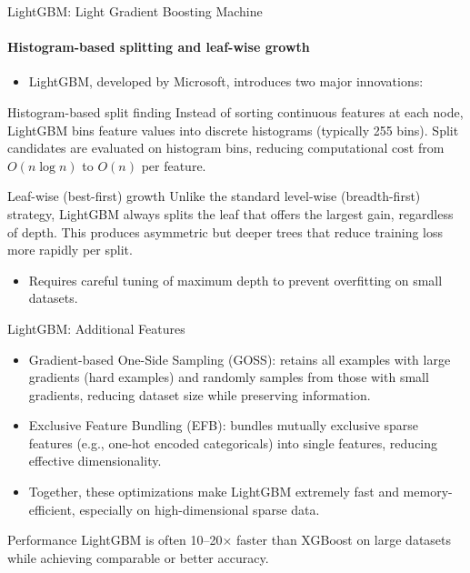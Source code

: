 \begin{frame}{LightGBM: Light Gradient Boosting Machine}
  \framesubtitle{Histogram-based splitting and leaf-wise growth}
  \begin{itemize}
    \item \alert{LightGBM}, developed by Microsoft, introduces two major innovations:
  \end{itemize}
  \begin{block}{Histogram-based split finding}
    Instead of sorting continuous features at each node, LightGBM bins feature values into
    discrete histograms (typically 255 bins). Split candidates are evaluated on histogram bins,
    reducing computational cost from $O(n\log n)$ to $O(n)$ per feature.
  \end{block}
  \begin{block}{Leaf-wise (best-first) growth}
    Unlike the standard level-wise (breadth-first) strategy, LightGBM always splits the leaf
    that offers the \alert{largest gain}, regardless of depth. This produces asymmetric but
    deeper trees that reduce training loss more rapidly per split.
  \end{block}
  \begin{itemize}
    \item Requires careful tuning of maximum depth to prevent overfitting on small datasets.
  \end{itemize}
\end{frame}

\begin{frame}{LightGBM: Additional Features}
  \begin{itemize}
    \item \alert{Gradient-based One-Side Sampling (GOSS)}: retains all examples with large
          gradients (hard examples) and randomly samples from those with small gradients,
          reducing dataset size while preserving information.
    \item \alert{Exclusive Feature Bundling (EFB)}: bundles mutually exclusive sparse features
          (e.g., one-hot encoded categoricals) into single features, reducing effective
          dimensionality.
    \item Together, these optimizations make LightGBM extremely fast and memory-efficient,
          especially on high-dimensional sparse data.
  \end{itemize}
  \begin{block}{Performance}
    LightGBM is often \alert{10--20× faster} than XGBoost on large datasets while achieving
    comparable or better accuracy.
  \end{block}
\end{frame}

